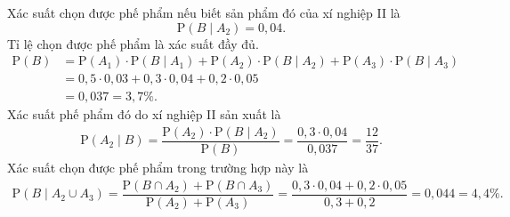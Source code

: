 \begin{ex}
{		\begin{itemchoice}
			\itemch Xác suất chọn được phế phẩm nếu biết sản phẩm đó của xí nghiệp II là \[\mathrm{P}\left(B\mid A_2\right) = 0{,}04.\]
			\itemch Tỉ lệ chọn được phế phẩm là xác suất đầy đủ.
			\begin{align*}
				\mathrm{P}\left(B\right) &= \mathrm{P}\left(A_1\right) \cdot \mathrm{P}\left(B\mid A_1\right) + \mathrm{P}\left(A_2\right) \cdot \mathrm{P}\left(B\mid A_2\right) + \mathrm{P}\left(A_3\right) \cdot \mathrm{P}\left(B\mid A_3\right)\\& = 0{,}5 \cdot 0{,}03 + 0{,}3 \cdot 0{,}04 + 0{,}2 \cdot 0{,}05\\& = 0{,}037 = 3{,}7\%.
			\end{align*}
			\itemch Xác suất phế phẩm đó do xí nghiệp II sản xuất là
			\begin{align*}
				\mathrm{P}\left(A_2\mid B\right) = \dfrac{\mathrm{P}\left(A_2\right) \cdot \mathrm{P}\left(B\mid A_2\right)}{\mathrm{P}\left(B\right)} = \dfrac{0{,}3 \cdot 0{,}04}{0{,}037} = \dfrac{12}{37}.
			\end{align*}
			\itemch Xác suất chọn được phế phẩm trong trường hợp này là
			\begin{align*}
				\mathrm{P}\left(B\mid A_2 \cup A_3\right) = \dfrac{\mathrm{P}\left(B \cap A_2\right) + \mathrm{P}\left(B \cap A_3\right)}{\mathrm{P}\left(A_2\right) + \mathrm{P}\left(A_3\right)} = \dfrac{0{,}3 \cdot 0{,}04 + 0{,}2 \cdot 0{,}05}{0{,}3 + 0{,}2} = 0{,}044 = 4{,}4\%.
			\end{align*}
		\end{itemchoice}
	}
\end{ex}

